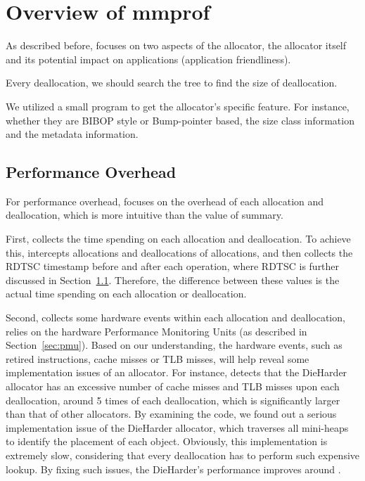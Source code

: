 \section{Overview of mmprof}

As described before, \MP{} focuses on two aspects of the allocator, the allocator itself and its potential impact on applications (application friendliness). 

Every deallocation, we should search the tree to find the size of deallocation. 

 
We utilized a small program to get the allocator's specific feature. For instance, whether they are BIBOP style or Bump-pointer based, the size class information and the metadata information. 
\subsection{Performance Overhead}

For performance overhead, \MP{} focuses on the overhead of each allocation and deallocation, which is more intuitive than the value of summary. 

First, \MP{} collects the time spending on each allocation and deallocation. To achieve this, \MP{} intercepts allocations and deallocations of allocations, and then collects the RDTSC timestamp before and after each operation, where RDTSC is further discussed in Section~\ref{}. Therefore, the difference between these values is the actual time spending on each allocation or deallocation.


% 

Second, \MP{} collects some hardware events within each allocation and deallocation, relies on the hardware Performance Monitoring Units (as described in Section~\ref{sec:pmu}). Based on our understanding, the hardware events, such as retired instructions, cache misses or TLB misses, will help reveal some implementation issues of an allocator. For instance, \MP{} detects that the DieHarder allocator has an excessive number of cache misses and TLB misses upon each deallocation, around 5 times of each deallocation, which is significantly larger than that of other allocators. By examining the code, we found out a serious implementation issue of the DieHarder allocator, which traverses all mini-heaps to identify the placement of each object. Obviously, this implementation is extremely slow, considering that every deallocation has to perform such expensive lookup. By fixing such issues, the DieHarder's performance improves around .     


